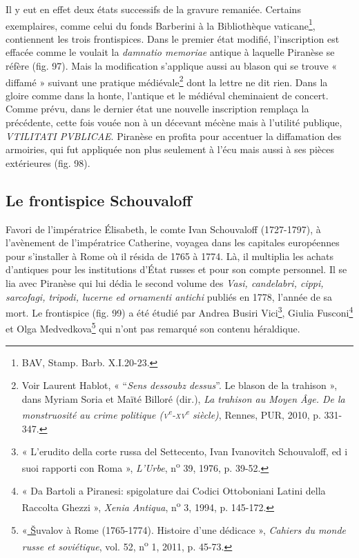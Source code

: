 \documentclass[12pt,twoside,openany]{book}
\begin{document}
Il y eut en effet deux états successifs de la gravure remaniée. Certains exemplaires, comme celui du fonds Barberini à la Bibliothèque vaticane\footnote{BAV, Stamp. Barb. X.I.20-23.}, contiennent les trois frontispices. Dans le premier état modifié, l’inscription est effacée comme le voulait la \textit{damnatio memoriae} antique à laquelle Piranèse se réfère (fig. 97). Mais la modification s’applique aussi au blason qui se trouve « diffamé » suivant une pratique médiévale\footnote{Voir Laurent Hablot, « “\textit{Sens dessoubz dessus}”. Le blason de la trahison », dans Myriam Soria et Maïté Billoré (dir.), \textit{La trahison au Moyen Âge. De la monstruosité au crime politique (}\textit{\textsc{v}}\textit{\textsuperscript{e}}\textit{-}\textit{\textsc{xv}}\textit{\textsuperscript{e}}\textit{ siècle)}, Rennes, PUR, 2010, p. 331-347.} dont la lettre ne dit rien. Dans la gloire comme dans la honte, l’antique et le médiéval cheminaient de concert. Comme prévu, dans le dernier état une nouvelle inscription remplaça la précédente, cette fois vouée non à un décevant mécène mais à l’utilité publique, \textit{VTILITATI PVBLICAE}. Piranèse en profita pour accentuer la diffamation des armoiries, qui fut appliquée non plus seulement à l’écu mais aussi à ses pièces extérieures (fig. 98).

\subsection{Le frontispice Schouvaloff}

Favori de l’impératrice Élisabeth, le comte Ivan Schouvaloff (1727-1797), à l’avènement de l’impératrice Catherine, voyagea dans les capitales européennes pour s’installer à Rome où il résida de 1765 à 1774. Là, il multiplia les achats d’antiques pour les institutions d’État russes et pour son compte personnel. Il se lia avec Piranèse qui lui dédia le second volume des \textit{Vasi, candelabri, cippi, sarcofagi, tripodi, lucerne ed ornamenti antichi} publiés en 1778, l’année de sa mort. Le frontispice (fig. 99) a été étudié par Andrea Busiri Vici\footnote{« L’erudito della corte russa del Settecento, Ivan Ivanovitch Schouvaloff, ed i suoi rapporti con Roma », \textit{L’Urbe}, n\textsuperscript{o} 39, 1976, p. 39-52.}, Giulia Fusconi\footnote{« Da Bartoli a Piranesi: spigolature dai Codici Ottoboniani Latini della Raccolta Ghezzi », \textit{Xenia Antiqua}, n\textsuperscript{o} 3, 1994, p. 145-172.} et Olga Medvedkova\footnote{«\href{https://fr.wikipedia.org/wiki/Š}{ Š}uvalov à Rome (1765-1774). Histoire d’une dédicace », \textit{Cahiers du monde russe et soviétique}, vol. 52, n\textsuperscript{o} 1, 2011, p. 45-73.} qui n’ont pas remarqué son contenu héraldique.
\end{document}
